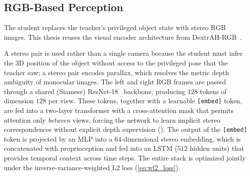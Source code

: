 \subsection{RGB-Based Perception}%
\label{sec:rgb_perception}%

The student replaces the teacher's privileged object state with stereo RGB images.
This thesis reuses the visual encoder architecture from DextrAH-RGB~\cite{Singh2025}.

A stereo pair is used rather than a single camera because the student must infer the 3D position of the object without access to the privileged pose that the teacher saw; a stereo pair encodes parallax, which resolves the metric depth ambiguity of monocular images.
The left and right RGB frames are passed through a shared (Siamese) ResNet-18~\cite{He2016} backbone, producing $128$ tokens of dimension $128$ per view.
These tokens, together with a learnable \verb|[embed]| token, are fed into a two-layer transformer with a cross-attention mask that permits attention only \emph{between} views, forcing the network to learn implicit stereo correspondences without explicit depth supervision ().
The output of the \verb|[embed]| token is projected by an \ac{MLP} into a $64$-dimensional stereo embedding, which is concatenated with proprioception and fed into an \ac{LSTM} ($512$ hidden units) that provides temporal context across time steps.
The entire stack is optimized jointly under the inverse-variance-weighted L2 loss (\cref{eq:wl2_loss}).


